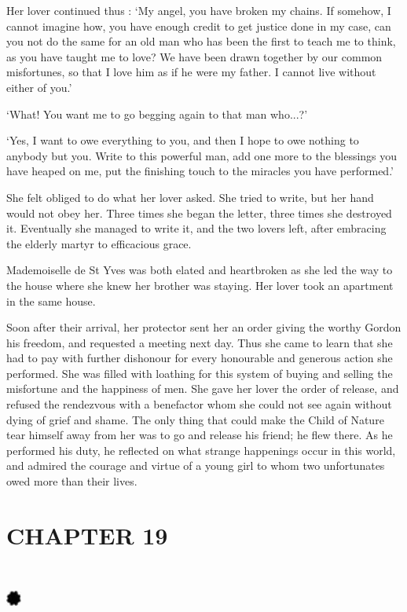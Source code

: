 \documentclass{article}
\begin{document}
\begin{center}
Her lover continued thus : `My angel, you have broken my chains. If somehow, I 
cannot imagine how, you have enough credit to get justice done in my case, can 
you not do the same for an old man who has been the first to teach me to think, 
as you have taught me to love? We have been drawn together by our common misfortunes, 
so that I love him as if he were my father. I cannot live without either of you.' 

`What! You want me to go begging again to that man who...?' 

`Yes, I want to owe everything to you, and then I hope to owe nothing to anybody 
but you. Write to this powerful man, add one more to the blessings you have heaped 
on me, put the finishing touch to the miracles you have performed.' 

She felt obliged to do what her lover asked. She tried to write, but her hand would 
not obey her. Three times she began the letter, three times she destroyed it. Eventually 
she managed to write it, and the two lovers left, after embracing the elderly martyr 
to efficacious grace. 

Mademoiselle de St Yves was both elated and heartbroken as she led the way to the 
house where she knew her brother was staying. Her lover took an apartment in the 
same house. 

Soon after their arrival, her protector sent her an order giving the worthy Gordon 
his freedom, and requested a meeting next day. Thus she came to learn that she 
had to pay with further dishonour for every honourable and generous action she 
performed. She was filled with loathing for this system of buying and selling the 
misfortune and the happiness of men. She gave her lover the order of release, and 
refused the rendezvous with a benefactor whom she could not see again without dying 
of grief and shame. The only thing that could make the Child of Nature tear himself 
away from her was to go and release his friend; he flew there. As he performed 
his duty, he reflected on what strange happenings occur in this world, and admired 
the courage and virtue of a young girl to whom two unfortunates owed more than 
their lives.\pagebreak{} 

\section*{\textbf{CHAPTER 19  }}

\section*{%
\includegraphics[width=14pt, height=15pt, keepaspectratio=true]{Zadig or L'Ingenu - Voltaire-fig041.jpg}
}


\end{center}
\end{document}
